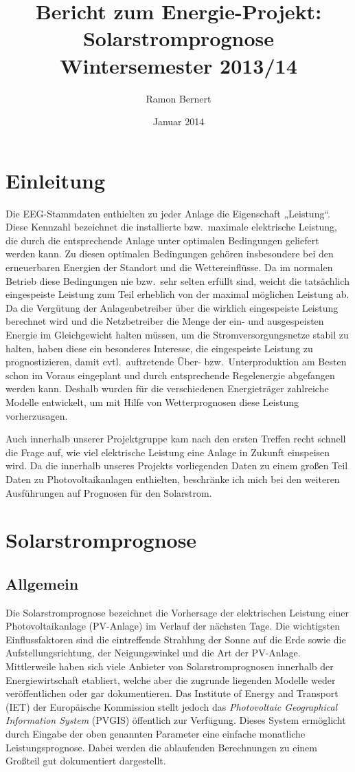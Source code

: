 \documentclass[a4paper,11pt]{article}
\title{Bericht zum Energie-Projekt: Solarstromprognose\\ Wintersemester
  2013/14}
\author{Ramon Bernert}
\date{Januar 2014}
\begin{document}
\maketitle

\section{Einleitung} 
Die EEG-Stammdaten enthielten zu jeder Anlage die Eigenschaft „Leistung“.
Diese Kennzahl bezeichnet die installierte bzw.\ maximale elektrische
Leistung, die durch die entsprechende Anlage unter optimalen Bedingungen
geliefert werden kann. Zu diesen optimalen Bedingungen gehören insbesondere
bei den erneuerbaren Energien der Standort und die Wettereinflüsse. Da im
normalen Betrieb diese Bedingungen nie bzw.\ sehr selten erfüllt sind, weicht
die tatsächlich eingespeiste Leistung zum Teil erheblich von der maximal
möglichen Leistung ab. Da die Vergütung der Anlagenbetreiber über die wirklich
eingespeiste Leistung berechnet wird und die Netzbetreiber die Menge der ein-
und ausgespeisten Energie im Gleichgewicht halten müssen, um die
Stromversorgungsnetze stabil zu halten, haben diese ein besonderes Interesse,
die eingespeiste Leistung zu prognostizieren, damit evtl.\ auftretende Über-
bzw.\ Unterproduktion am Besten schon im Voraus eingeplant und durch
entsprechende Regelenergie abgefangen werden kann. Deshalb wurden für die
verschiedenen Energieträger zahlreiche Modelle entwickelt, um mit Hilfe von
Wetterprognosen diese Leistung vorherzusagen.

Auch innerhalb unserer Projektgruppe kam nach den ersten Treffen recht schnell
die Frage auf, wie viel elektrische Leistung eine Anlage in Zukunft einspeisen
wird. Da die innerhalb unseres Projekts vorliegenden Daten zu einem großen
Teil Daten zu Photovoltaikanlagen enthielten, beschränke ich mich bei den
weiteren Ausführungen auf Prognosen für den Solarstrom.

\section{Solarstromprognose}
\subsection{Allgemein}
Die Solarstromprognose bezeichnet die Vorhersage der elektrischen Leistung
einer Photovoltaikanlage (PV-Anlage) im Verlauf der nächsten Tage. Die
wichtigsten Einflussfaktoren sind die eintreffende Strahlung der Sonne auf die
Erde sowie die Aufstellungsrichtung, der Neigungswinkel und die Art der
PV-Anlage.  Mittlerweile haben sich viele Anbieter von Solarstromprognosen
innerhalb der Energiewirtschaft etabliert, welche aber die zugrunde liegenden
Modelle weder veröffentlichen oder gar dokumentieren. Das Institute of Energy
and Transport (IET) der Europäische Kommission stellt jedoch das
\emph{Photovoltaic Geographical Information System} (PVGIS) öffentlich zur
Verfügung. Dieses System ermöglicht durch Eingabe der oben genannten Parameter
eine einfache monatliche Leistungsprognose. Dabei werden die ablaufenden
Berechnungen zu einem Großteil gut dokumentiert dargestellt.
\end{document}
